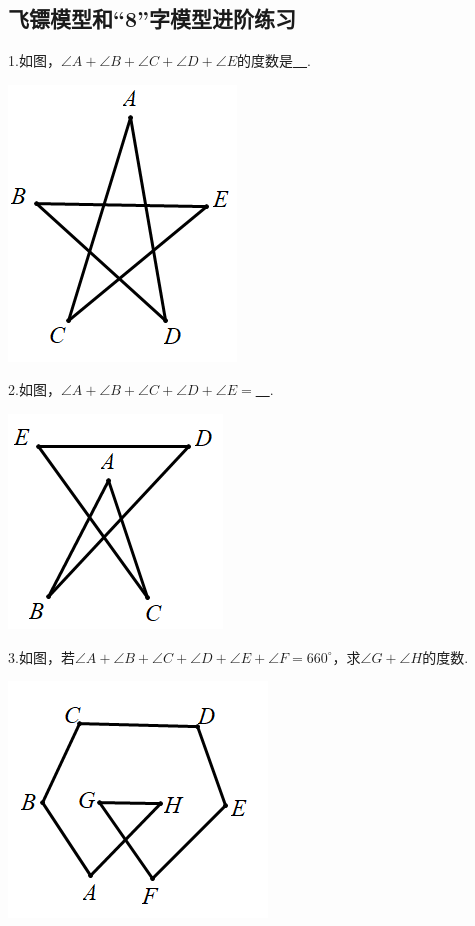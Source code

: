 \documentclass[10pt]{ctexart}
\begin{document}
\subsection{飞镖模型和“8”字模型进阶练习}
\begin{shaded}
1.如图，$\angle A+\angle B+\angle C+\angle D+\angle E$的度数是\underline{~\hspace{1cm}~}.
\end{shaded}
 \includegraphics[scale=0.5]{figure/bazhi09.PNG}
\begin{shaded} 
2.如图，$\angle A+\angle B+\angle C+\angle D+\angle E=$\underline{~\hspace{1cm}~}.
\end{shaded}
 \includegraphics[scale=0.5]{figure/bazhi10.PNG}
\begin{shaded} 
3.如图，若$\angle A+\angle B+\angle C+\angle D+\angle E+\angle F=660^\circ$，求$\angle G+\angle H$的度数.
\end{shaded}
 \includegraphics[scale=0.5]{figure/bazhi11.PNG}
\end{document}
